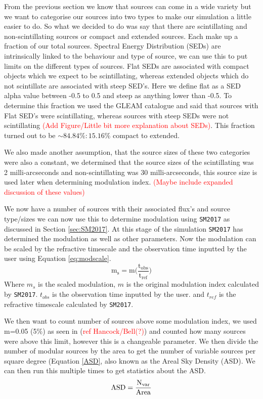 \documentclass[a4paper]{article}
\begin{document}
From the previous section we know that sources can come in a wide variety but we want to categorise our sources into two types to make our simulation a little easier to do. So what we decided to do was say that there are scintillating and non-scintillating sources or compact and extended sources. Each make up a fraction of our total sources. Spectral Energy Distribution (SEDs) are intrinsically linked to the behaviour and type of source, we can use this to put limits on the different types of sources. Flat SEDs are associated with compact objects which we expect to be scintillating, whereas extended objects which do not scintillate are associated with steep SED's. Here we define flat as a SED alpha value between -0.5 to 0.5 and steep as anything lower than -0.5. To determine this fraction we used the GLEAM catalogue \citep{Gleam} and said that sources with Flat SED's were scintillating, whereas sources with steep SEDs were not scintillating \textcolor{red}{(Add Figure/Little bit more explanation about SEDs)}. This fraction turned out to be $\sim 84.84\%:15.16\%$ compact to extended.

We also made another assumption, that the source sizes of these two categories were also a constant, we determined that the source sizes of the scintillating was 2 milli-arcseconds and non-scintillating was 30 milli-arcseconds, this source size is used later when determining modulation index. \textcolor{red}{(Maybe include expanded discussion of these values)}

We now have a number of sources with their associated flux's and source type/sizes we can now use this to determine modulation using \texttt{SM2017} as discussed in Section \ref{sec:SM2017}. At this stage of the simulation \texttt{\texttt{SM2017}} has determined the modulation as well as other parameters. Now the modulation can be scaled by the refractive timescale and the observation time inputted by the user using Equation \ref{eq:modscale}.
\begin{equation}\label{eq:modscale}\mathrm{ 
m_{s}=m\bigg(\dfrac{t_{obs}}{t_{ref}}\bigg)
}\end{equation}
Where $m_s$ is the scaled modulation, $m$ is the original modulation index calculated by \texttt{\texttt{SM2017}}. $t_{obs}$ is the observation time inputted by the user. and $t_{ref}$ is the refractive timescale calculated by \texttt{\texttt{SM2017}}.
 
We then want to count number of sources above some modulation index, we used m=0.05 (5\%) as seen in (\textcolor{red}{ref Hancock/Bell(?)}) and counted how many sources were above this limit, however this is a changeable parameter. We then divide the number of modular sources by the area to get the number of variable sources per square degree (Equation \ref{ASD}, also known as the Areal Sky Density (ASD). We can then run this multiple times to get statistics about the ASD.\\
\begin{equation}\mathrm{\label{ASD}
    ASD=\dfrac{N_{var}}{Area}
}\end{equation}
\end{document}
